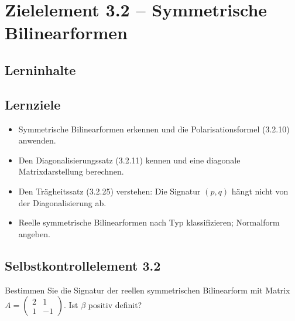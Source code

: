 \documentclass[a4paper,12pt]{article}
\begin{document}
\newpage

\section*{Zielelement 3.2 -- Symmetrische Bilinearformen}

\subsection*{Lerninhalte}
\begin{center}
\end{center}

\subsection*{Lernziele}
\begin{itemize}
  \item Symmetrische Bilinearformen erkennen und die Polarisationsformel (3.2.10) anwenden.
  \item Den Diagonalisierungssatz (3.2.11) kennen und eine diagonale Matrixdarstellung berechnen.
  \item Den Trägheitssatz (3.2.25) verstehen: Die Signatur $(p,q)$ hängt nicht von der Diagonalisierung ab.
  \item Reelle symmetrische Bilinearformen nach Typ klassifizieren; Normalform angeben.
\end{itemize}

\subsection*{Selbstkontrollelement 3.2}
Bestimmen Sie die Signatur der reellen symmetrischen Bilinearform mit Matrix
$A = \begin{pmatrix}2 & 1 \\ 1 & -1\end{pmatrix}$. Ist $\beta$ positiv definit?
\end{document}

